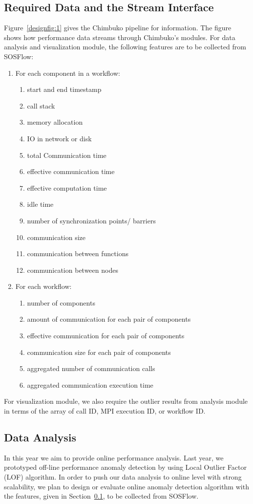 \subsection{Required Data and the Stream Interface}
\label{subsection:features}
Figure~\ref{designfig:1} gives the Chimbuko pipeline for information. The figure shows how performance data streams through Chimbuko's modules. For data analysis and visualization module, the following features are to be collected from SOSFlow:
\begin{enumerate}
\item {For each component in a workflow:}
\begin{enumerate}
\item start and end timestamp
\item call stack
\item memory allocation
\item IO in network or disk
\item total Communication time
\item effective  communication time
\item effective computation time
\item idle time
\item number of synchronization points/ barriers
\item communication size
\item communication between functions
\item communication between nodes
\end{enumerate}
\item  For each workflow:
\begin{enumerate}
\item number of components
\item amount of communication for each pair of components
\item effective communication for each pair of components
\item communication size for each pair of components
\item aggregated number of communication calls 
\item aggregated communication execution time
\end{enumerate}
\end{enumerate}

For visualization module, we also require the outlier results from analysis module in terms of the array of call ID, MPI execution ID, or workflow ID. 


\subsection{Data Analysis}
In this year we aim to provide online performance analysis. Last year, we prototyped off-line performance anomaly detection by using Local Outlier Factor (LOF) algorithm. In order to push our data analysis to online level with strong scalability, we plan to design or evaluate online anomaly detection algorithm  with the features, given in Section~\ref{subsection:features}, to be collected from SOSFlow.


